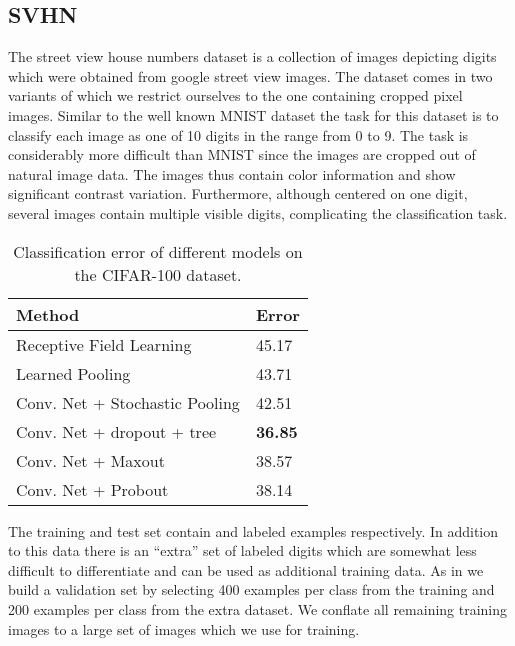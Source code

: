 \documentclass{article} \pdfoutput=1
\begin{document}
\subsection{SVHN}
The street view house numbers dataset \cite{Netzer2011} is a
collection of images depicting digits which were obtained from google
street view images. The dataset comes in two variants of which we
restrict ourselves to the one containing cropped  pixel
images. Similar to the well known MNIST dataset \cite{LeCun1998} the
task for this dataset is to classify each image as one of 10 digits in
the range from 0 to 9. The task is considerably more difficult than
MNIST since the images are cropped out of natural image data. The
images thus contain color information and show significant contrast
variation. Furthermore, although centered on one digit, several images
contain multiple visible digits, complicating the classification task.


\begin{table}[t]
\vskip 0.15in
\caption{Classification error of different models on the
  CIFAR-100 dataset.}
\begin{center}
\begin{small}
\begin{sc}
\begin{tabular}{l|l}
Method  & Error \\
\hline
Receptive Field Learning \cite{Jia2012} & 45.17  \\
Learned Pooling \cite{Malinowski2013} & 43.71  \\
Conv. Net + Stochastic Pooling \cite{ZeilerStochastic2013} & 42.51  \\
Conv. Net + dropout + tree \cite{Nitish2013}  & \textbf{36.85 } \\
Conv. Net + Maxout  \cite{Goodfellow2013}  & 38.57  \\
Conv. Net + Probout  & 38.14  \\
\hline
\end{tabular}
\end{sc}
\end{small}
\end{center}
\vskip -0.1in
\label{cifar100_results}
\end{table}
The training and test set contain  and  labeled
examples respectively. In addition to this data there is an ``extra''
set of  labeled digits which are somewhat less difficult to
differentiate and can be used as additional training data. As in
\cite{Goodfellow2013} we build a validation set by
selecting 400 examples per class from the training and 200 examples
per class from the extra dataset. We conflate all remaining training
images to a large set of  images which we use for
training. 
\end{document}
